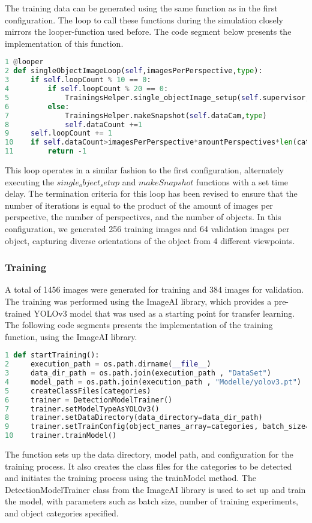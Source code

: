The training data can be generated using the same function as in the first configuration. The loop to call these functions during the simulation closely mirrors the looper-function used before. The code segment below presents the implementation of this function. 

\begin{lstlisting}[language=python]	
1 @looper
2 def singleObjectImageLoop(self,imagesPerPerspective,type):
3     if self.loopCount % 10 == 0:
4         if self.loopCount % 20 == 0:
5             TrainingsHelper.single_objectImage_setup(self.supervisor,self.mainTable,imagesPerPerspective)
6         else:
7             TrainingsHelper.makeSnapshot(self.dataCam,type)
8             self.dataCount +=1
9     self.loopCount += 1
10    if self.dataCount>imagesPerPerspective*amountPerspectives*len(categories): 
11        return -1
\end{lstlisting}

This loop operates in a similar fashion to the first configuration, alternately executing the \(single_object_setup\) and \(makeSnapshot\) functions with a set time delay. The termination criteria for this loop has been revised to ensure that the number of iterations is equal to the product of the amount of images per perspective, the number of perspectives, and the number of objects. In this configuration, we generated 256 training images and 64 validation images per object, capturing diverse orientations of the object from 4 different viewpoints.

\subsubsection{Training }

A total of 1456 images were generated for training and 384 images for validation. The training was performed using the ImageAI library, which provides a pre-trained YOLOv3 model that was used as a starting point for transfer learning. The following code segments presents the implementation of the training function, using the ImageAI library. 

\begin{lstlisting}[language=python]
1 def startTraining():
2     execution_path = os.path.dirname(__file__)
3     data_dir_path = os.path.join(execution_path , "DataSet")
4     model_path = os.path.join(execution_path , "Modelle/yolov3.pt")
5     createClassFiles(categories) 
6     trainer = DetectionModelTrainer()
7     trainer.setModelTypeAsYOLOv3()
8     trainer.setDataDirectory(data_directory=data_dir_path)
9     trainer.setTrainConfig(object_names_array=categories, batch_size=32, num_experiments=100, train_from_pretrained_model=model_path)
10    trainer.trainModel()
\end{lstlisting}
The function sets up the data directory, model path, and configuration for the training process. It also creates the class files for the categories to be detected and initiates the training process using the trainModel method. The DetectionModelTrainer class from the ImageAI library is used to set up and train the model, with parameters such as batch size, number of training experiments, and object categories specified. 

